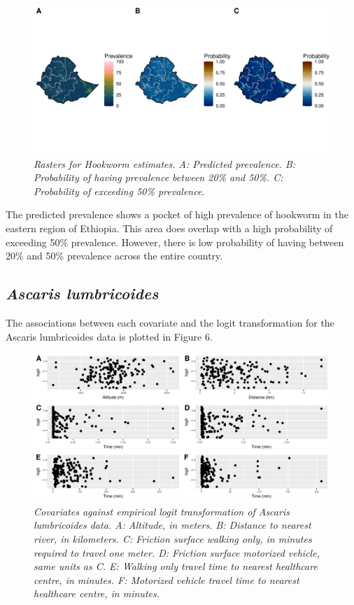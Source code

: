\documentclass[
]{article}
\begin{document}
\begin{figure}
\centering
\includegraphics{write_up_files/figure-latex/HK.prediction.rasters-1.pdf}
\caption{\emph{Rasters for Hookworm estimates. A: Predicted prevalence.
B: Probability of having prevalence between 20\% and 50\%. C:
Probability of exceeding 50\% prevalence.}}
\end{figure}

The predicted prevalence shows a pocket of high prevalence of hookworm
in the eastern region of Ethiopia. This area does overlap with a high
probability of exceeding 50\% prevalence. However, there is low
probability of having between 20\% and 50\% prevalence across the entire
country.

\newpage

\hypertarget{ascaris-lumbricoides}{%
\subsection{\texorpdfstring{\emph{Ascaris
lumbricoides}}{Ascaris lumbricoides}}\label{ascaris-lumbricoides}}

The associations between each covariate and the logit transformation for
the Ascaris lumbricoides data is plotted in Figure 6.

\begin{figure}
\centering
\includegraphics{write_up_files/figure-latex/Asc_e.logit-1.pdf}
\caption{\textit{Covariates against empirical logit transformation of Ascaris lumbricoides data. A: Altitude, in meters. B: Distance to nearest river, in kilometers. C: Friction surface walking only, in minutes required to travel one meter. D: Friction surface motorized vehicle, same units as C. E: Walking only travel time to nearest healthcare centre, in minutes. F: Motorized vehicle travel time to nearest healthcare centre, in minutes.}}
\end{figure}
\end{document}
